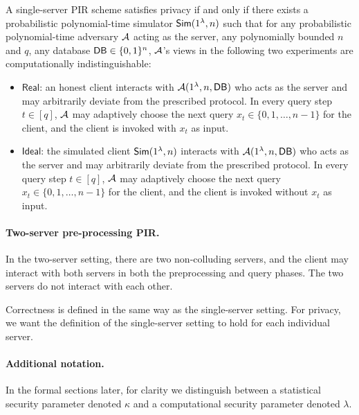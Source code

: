 A single-server PIR scheme satisfies privacy if and only if there exists a probabilistic polynomial-time simulator $\mathsf{Sim}(1^\lambda,n)$ such that for any probabilistic polynomial-time adversary $\mathcal{A}$ acting as the server, any polynomially bounded $n$ and $q$, any database $\mathsf{DB}\in \{0,1\}^n$, $\mathcal{A}$'s
views in the following two experiments are computationally indistinguishable:
\begin{itemize}
    \item $\mathsf{Real}$:  an honest client interacts with $\mathcal{A}(1^\lambda,n,\mathsf{DB})$ who acts as the server and may arbitrarily deviate from the prescribed protocol. In every query step $t\in [q]$, $\mathcal{A}$ may adaptively choose the next query $x_t\in \{0,1,\ldots,n-1\}$ for the client, and the client is invoked with $x_t$ as input.
    \item $\mathsf{Ideal}$: the simulated client $\mathsf{Sim}(1^\lambda,n)$ interacts with $\mathcal{A}(1^\lambda,n,\mathsf{DB})$ who acts as the server and may arbitrarily deviate from the prescribed protocol. In every  query step $t\in [q]$, $\mathcal{A}$ may adaptively choose the next query $x_t\in \{0,1,\ldots,n-1\}$ for the client, and the client is invoked without $x_t$ as input.
\end{itemize}

\paragraph{Two-server pre-processing PIR.}
In the two-server setting, there are two non-colluding servers, and the client
may interact with both servers in both the preprocessing and query phases. 
The two servers do not interact with each other.

Correctness is defined in the same way as the single-server setting. 
For privacy, we want the definition of the single-server setting
to hold for each individual server. 

\paragraph{Additional notation.}
In the formal sections later, for clarity we  
distinguish
between a statistical security parameter denoted $\kappa$
and a computational security parameter denoted $\lambda$.
